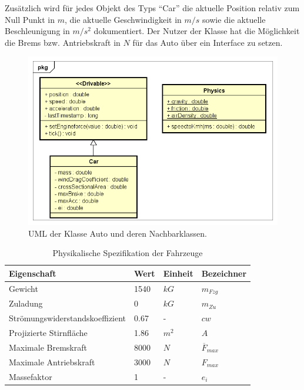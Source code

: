 \documentclass[12pt,a4paper,bibliography=totocnumbered,listof=totocnumbered, abstracton]{scrartcl}
\theoremstyle{Umgebung}
\begin{document}
Zusätzlich wird für jedes Objekt des Typs \enquote{Car} die aktuelle Position relativ zum Null Punkt in $m$, die aktuelle Geschwindigkeit in $m/s$ sowie  die aktuelle Beschleunigung in $m/s^2$ dokumentiert. Der Nutzer der Klasse hat die Möglichkeit die Brems bzw. Antriebskraft in $N$ für das Auto über ein Interface zu setzen.

\begin{figure}
	\centering
	\includegraphics[width=0.7\linewidth]{img/practical/car-diagram}
	\caption{UML der Klasse Auto und deren Nachbarklassen.}
	\label{fig:car}
\end{figure}

\begin{table}[]
	\centering
	\caption{Physikalische Spezifikation der Fahrzeuge}
	\label{table:car}
	\begin{tabular}{@{}llll@{}}
		\toprule
		Eigenschaft                     & Wert & Einheit & Bezeichner           \\ \midrule
		Gewicht                         & 1540 & $kG$    & $m_{Fzg}$            \\
		Zuladung                        & 0    & $kG$    & $m_{Zu}$             \\
		Strömungswiderstandskoeffizient & 0.67 & -       & $cw$                 \\
		Projizierte Stirnfläche         & 1.86 & $m^2$   & $A$                  \\
		Maximale Bremskraft             & 8000 & $N$     & $\overline{F}_{max}$ \\
		Maximale Antriebskraft          & 3000 & $N$     & $ {F}_{max} $        \\
		Massefaktor                     & 1    & -       & $ {e}_{i} $          \\ \bottomrule
	\end{tabular}
\end{table}
\end{document}
